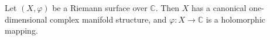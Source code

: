 Let $(X, \varphi)$ be a Riemann surface over $\mathbb{C}$. Then $X$ has a canonical one-dimensional complex manifold structure, and $\varphi: X \to \mathbb{C}$ is a holomorphic mapping.
